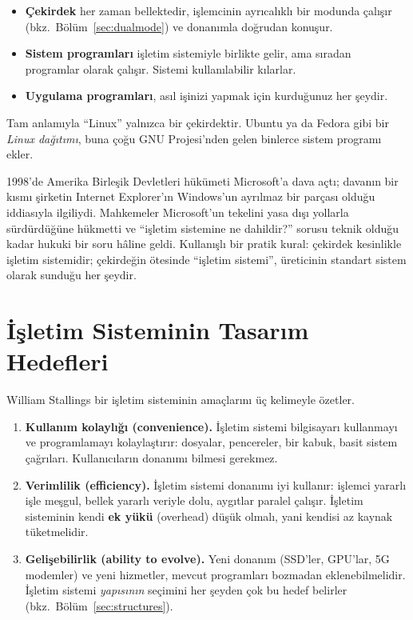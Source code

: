 \documentclass[11pt,a4paper]{article}
\newcommand{\term}[1]{\textbf{\color{mintdeep}#1}}
\begin{document}
\begin{itemize}
  \item \textbf{Çekirdek} her zaman bellektedir, işlemcinin ayrıcalıklı bir modunda çalışır (bkz.\ Bölüm~\ref{sec:dualmode}) ve donanımla doğrudan konuşur.
  \item \textbf{Sistem programları} işletim sistemiyle birlikte gelir, ama sıradan programlar olarak çalışır. Sistemi kullanılabilir kılarlar.
  \item \textbf{Uygulama programları}, asıl işinizi yapmak için kurduğunuz her şeydir.
\end{itemize}

Tam anlamıyla ``Linux'' yalnızca bir çekirdektir. Ubuntu ya da Fedora gibi bir \emph{Linux dağıtımı}, buna çoğu GNU Projesi'nden gelen binlerce sistem programı ekler.

\begin{histnote}
1998'de Amerika Birleşik Devletleri hükümeti Microsoft'a dava açtı; davanın bir kısmı şirketin Internet Explorer'ın Windows'un ayrılmaz bir parçası olduğu iddiasıyla ilgiliydi. Mahkemeler Microsoft'un tekelini yasa dışı yollarla sürdürdüğüne hükmetti ve ``işletim sistemine ne dahildir?'' sorusu teknik olduğu kadar hukuki bir soru hâline geldi. Kullanışlı bir pratik kural: çekirdek kesinlikle işletim sistemidir; çekirdeğin ötesinde ``işletim sistemi'', üreticinin standart sistem olarak sunduğu her şeydir.
\end{histnote}

\section{İşletim Sisteminin Tasarım Hedefleri}

William Stallings bir işletim sisteminin amaçlarını üç kelimeyle özetler.

\begin{enumerate}[leftmargin=1.4em]
  \item \textbf{Kullanım kolaylığı (convenience).} İşletim sistemi bilgisayarı kullanmayı ve programlamayı kolaylaştırır: dosyalar, pencereler, bir kabuk, basit sistem çağrıları. Kullanıcıların donanımı bilmesi gerekmez.
  \item \textbf{Verimlilik (efficiency).} İşletim sistemi donanımı iyi kullanır: işlemci yararlı işle meşgul, bellek yararlı veriyle dolu, aygıtlar paralel çalışır. İşletim sisteminin kendi \term{ek yükü} (overhead) düşük olmalı, yani kendisi az kaynak tüketmelidir.
  \item \textbf{Gelişebilirlik (ability to evolve).} Yeni donanım (SSD'ler, GPU'lar, 5G modemler) ve yeni hizmetler, mevcut programları bozmadan eklenebilmelidir. İşletim sistemi \emph{yapısının} seçimini her şeyden çok bu hedef belirler (bkz.\ Bölüm~\ref{sec:structures}).
\end{enumerate}
\end{document}
